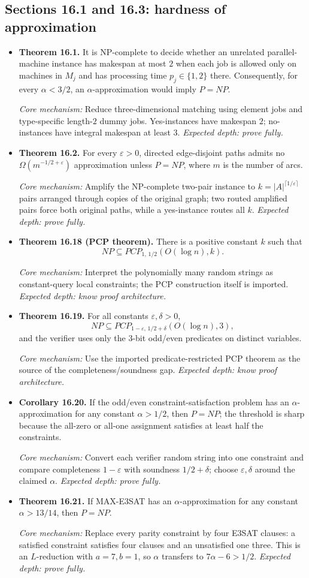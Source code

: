 \documentclass[11pt,a4paper]{article}
\newcommand{\1}{\mathbf 1}
\newcommand{\catalogue}[4]{%
  \item \textbf{#1.} #2\par
  {\footnotesize\emph{Core mechanism:} #3
  \emph{Expected depth: #4.}}}
\begin{document}
\subsection*{Sections 16.1 and 16.3: hardness of approximation}
\begin{itemize}
\catalogue{Theorem 16.1}{It is NP-complete to decide whether an unrelated
parallel-machine instance has makespan at most $2$ when each job is allowed
only on machines in $M_j$ and has processing time $p_j\in\{1,2\}$ there.
Consequently, for every $\alpha<3/2$, an $\alpha$-approximation would imply
$P=NP$.}{Reduce three-dimensional matching using element jobs and type-specific
length-$2$ dummy jobs. Yes-instances have makespan $2$; no-instances have
integral makespan at least $3$.}{prove fully}

\catalogue{Theorem 16.2}{For every $\varepsilon>0$, directed edge-disjoint
paths admits no $\Omega(m^{-1/2+\varepsilon})$ approximation unless $P=NP$,
where $m$ is the number of arcs.}{Amplify the NP-complete two-pair instance
to $k=|A|^{\lceil1/\varepsilon\rceil}$ pairs arranged through copies of the
original graph; two routed amplified pairs force both original paths, while a
yes-instance routes all $k$.}{prove fully}

\catalogue{Theorem 16.18 (PCP theorem)}{There is a positive constant $k$ such
that
\[
NP\subseteq PCP_{1,\,1/2}(O(\log n),k).
\]}
{Interpret the polynomially many random strings as constant-query local
constraints; the PCP construction itself is imported.}{know proof architecture}

\catalogue{Theorem 16.19}{For all constants $\varepsilon,\delta>0$,
\[
NP\subseteq PCP_{1-\varepsilon,\,1/2+\delta}(O(\log n),3),
\]
and the verifier uses only the $3$-bit odd/even predicates on distinct
variables.}{Use the imported predicate-restricted PCP theorem as the source of
the completeness/soundness gap.}{know proof architecture}

\catalogue{Corollary 16.20}{If the odd/even constraint-satisfaction problem
has an $\alpha$-approximation for any constant $\alpha>1/2$, then $P=NP$;
the threshold is sharp because the all-zero or all-one assignment satisfies
at least half the constraints.}{Convert each verifier random string into one
constraint and compare completeness $1-\varepsilon$ with soundness
$1/2+\delta$; choose $\varepsilon,\delta$ around the claimed $\alpha$.}
{prove fully}

\catalogue{Theorem 16.21}{If MAX-E3SAT has an $\alpha$-approximation for any
constant $\alpha>13/14$, then $P=NP$.}{Replace every parity constraint by four
E3SAT clauses: a satisfied constraint satisfies four clauses and an
unsatisfied one three. This is an $L$-reduction with $a=7,b=1$, so
$\alpha$ transfers to $7\alpha-6>1/2$.}{prove fully}


\end{itemize}
\end{document}
